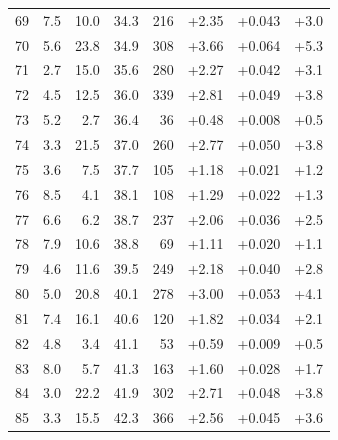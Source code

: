\begin{longtable}{@{}r r r r r r r r@{}}
69 & 7.5 & 10.0 & 34.3 & 216 & \cellcolor{green!35}+2.35 & \cellcolor{yellow!36}+0.043 & \cellcolor{orange!32}+3.0 \\
70 & 5.6 & 23.8 & 34.9 & 308 & \cellcolor{green!49}+3.66 & \cellcolor{yellow!48}+0.064 & \cellcolor{orange!48}+5.3 \\
71 & 2.7 & 15.0 & 35.6 & 280 & \cellcolor{green!34}+2.27 & \cellcolor{yellow!35}+0.042 & \cellcolor{orange!33}+3.1 \\
72 & 4.5 & 12.5 & 36.0 & 339 & \cellcolor{green!40}+2.81 & \cellcolor{yellow!40}+0.049 & \cellcolor{orange!38}+3.8 \\
73 & 5.2 & 2.7 & 36.4 & 36 & \cellcolor{green!16}+0.48 & \cellcolor{yellow!15}+0.008 & \cellcolor{orange!15}+0.5 \\
74 & 3.3 & 21.5 & 37.0 & 260 & \cellcolor{green!39}+2.77 & \cellcolor{yellow!40}+0.050 & \cellcolor{orange!38}+3.8 \\
75 & 3.6 & 7.5 & 37.7 & 105 & \cellcolor{green!23}+1.18 & \cellcolor{yellow!23}+0.021 & \cellcolor{orange!20}+1.2 \\
76 & 8.5 & 4.1 & 38.1 & 108 & \cellcolor{green!24}+1.29 & \cellcolor{yellow!23}+0.022 & \cellcolor{orange!21}+1.3 \\
77 & 6.6 & 6.2 & 38.7 & 237 & \cellcolor{green!32}+2.06 & \cellcolor{yellow!32}+0.036 & \cellcolor{orange!29}+2.5 \\
78 & 7.9 & 10.6 & 38.8 & 69 & \cellcolor{green!22}+1.11 & \cellcolor{yellow!22}+0.020 & \cellcolor{orange!19}+1.1 \\
79 & 4.6 & 11.6 & 39.5 & 249 & \cellcolor{green!33}+2.18 & \cellcolor{yellow!34}+0.040 & \cellcolor{orange!31}+2.8 \\
80 & 5.0 & 20.8 & 40.1 & 278 & \cellcolor{green!42}+3.00 & \cellcolor{yellow!42}+0.053 & \cellcolor{orange!40}+4.1 \\
81 & 7.4 & 16.1 & 40.6 & 120 & \cellcolor{green!30}+1.82 & \cellcolor{yellow!31}+0.034 & \cellcolor{orange!26}+2.1 \\
82 & 4.8 & 3.4 & 41.1 & 53 & \cellcolor{green!17}+0.59 & \cellcolor{yellow!16}+0.009 & \cellcolor{orange!15}+0.5 \\
83 & 8.0 & 5.7 & 41.3 & 163 & \cellcolor{green!27}+1.60 & \cellcolor{yellow!27}+0.028 & \cellcolor{orange!24}+1.7 \\
84 & 3.0 & 22.2 & 41.9 & 302 & \cellcolor{green!39}+2.71 & \cellcolor{yellow!39}+0.048 & \cellcolor{orange!38}+3.8 \\
85 & 3.3 & 15.5 & 42.3 & 366 & \cellcolor{green!37}+2.56 & \cellcolor{yellow!37}+0.045 & \cellcolor{orange!36}+3.6 \\

\end{longtable}

